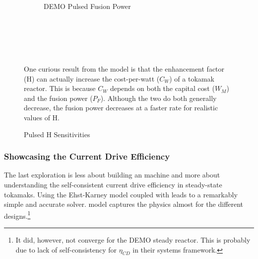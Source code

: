 \begin{figure*}
\begin{subfigure}[t]{0.45\textwidth}
\begin{adjustbox}{width=\textwidth}
			\Large
			
		\end{adjustbox}
        \caption{DEMO Pulsed Fusion Power}
    \end{subfigure}
    \hfill \hfill ~\\ ~\\ ~\\
    \caption{Pulsed H Sensitivities}
    \label{fig:pulsed_h} ~ \\
    \small{ One curious result from the model is that the enhancement factor (H) can actually increase the cost-per-watt ($C_W$) of a tokamak reactor. This is because $C_W$ depends on both the capital cost ($W_M$) and the fusion power ($P_F$). Although the two do both generally decrease, the fusion power decreases at a faster rate for realistic values of H. }
\end{figure*}

\subsubsection{Showcasing the Current Drive Efficiency}

The last exploration is less about building an  machine and more about understanding the self-consistent current drive efficiency in steady-state tokamaks. Using the Ehst-Karney model \cite{ehstkarney} coupled with \cite{jeff} leads to a remarkably simple and accurate solver.  model captures the physics almost  for the different designs.\footnote{ It did, however, not converge for the DEMO steady reactor. This is probably due to lack of self-consistency for $\eta_{CD}$ in their systems framework. }

